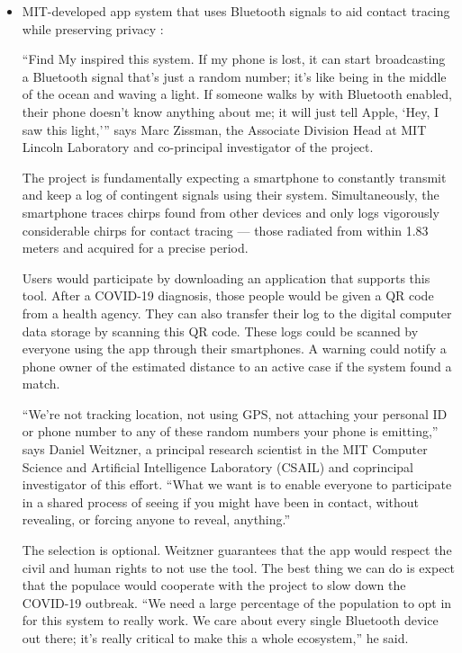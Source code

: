 \begin{itemize}
\begin{itemize}
          \item MIT-developed app system that uses Bluetooth signals to aid contact tracing while preserving privacy \parencite{MIT_App}:
          \par “Find My \parencite{AppleFindMy} inspired this system. If my phone is lost, it can start broadcasting a Bluetooth signal that’s just a random number; it’s like being in the middle of the ocean and waving a light. If someone walks by with Bluetooth enabled, their phone doesn’t know anything about me; it will just tell Apple, ‘Hey, I saw this light,’” says Marc Zissman, the Associate Division Head at MIT Lincoln Laboratory and co-principal investigator of the project.
          \par The project is fundamentally expecting a smartphone to constantly transmit and keep a log of contingent signals using their system. Simultaneously, the smartphone traces chirps found from other devices and only logs vigorously considerable chirps for contact tracing — those radiated from within 1.83 meters and acquired for a precise period.
          \par Users would participate by downloading an application that supports this tool. After a COVID-19 diagnosis, those people would be given a QR code from a health agency. They can also transfer their log to the digital computer data storage by scanning this QR code. These logs could be scanned by everyone using the app through their smartphones. A warning could notify a phone owner of the estimated distance to an active case if the system found a match.
          \par “We’re not tracking location, not using GPS, not attaching your personal ID or phone number to any of these random numbers your phone is emitting,” says Daniel Weitzner, a principal research scientist in the MIT Computer Science and Artificial Intelligence Laboratory (CSAIL) and coprincipal investigator of this effort. “What we want is to enable everyone to participate in a shared process of seeing if you might have been in contact, without revealing, or forcing anyone to reveal, anything.”
          \par The selection is optional. Weitzner guarantees that the app would respect the civil and human rights to not use the tool. The best thing we can do is expect that the populace would cooperate with the project to slow down the COVID-19 outbreak. “We need a large percentage of the population to opt in for this system to really work. We care about every single Bluetooth device out there; it’s really critical to make this a whole ecosystem,” he said.
        \end{itemize}
      \end{itemize}

